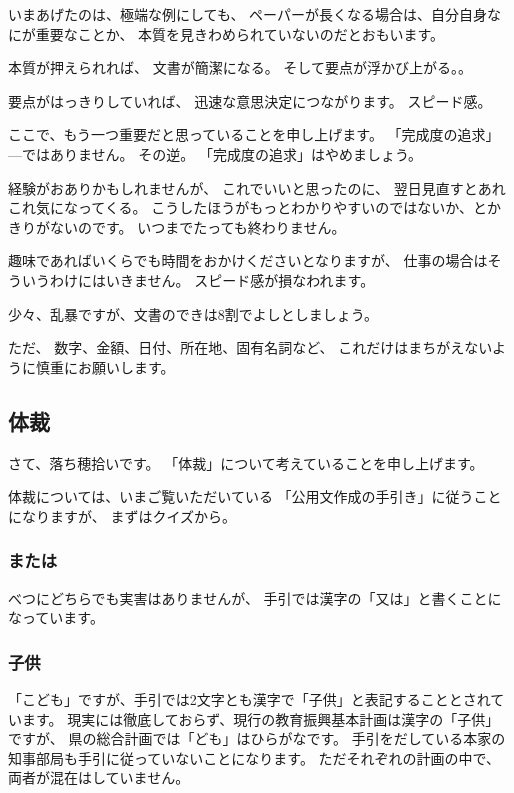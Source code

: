 \documentclass[uplatex,jis2004,dvipdfmx,12pt]{jsarticle}
\begin{document}
いまあげたのは、極端な例にしても、
ペーパーが長くなる場合は、自分自身なにが重要なことか、
本質を見きわめられていないのだとおもいます。

本質が押えられれば、
文書が簡潔になる。
そして要点が浮かび上がる。。


要点がはっきりしていれば、
迅速な意思決定につながります。
スピード感。

ここで、もう一つ重要だと思っていることを申し上げます。
「完成度の追求」---ではありません。
その逆。
「完成度の追求」はやめましょう。

経験がおありかもしれませんが、
これでいいと思ったのに、
翌日見直すとあれこれ気になってくる。
こうしたほうがもっとわかりやすいのではないか、とかきりがないのです。
いつまでたっても終わりません。

趣味であればいくらでも時間をおかけくださいとなりますが、
仕事の場合はそういうわけにはいきません。
スピード感が損なわれます。

少々、乱暴ですが、文書のできは8割でよしとしましょう。


ただ、
数字、金額、日付、所在地、固有名詞など、
これだけはまちがえないように慎重にお願いします。




\subsection{体裁}
さて、落ち穂拾いです。
「体裁」について考えていることを申し上げます。


体裁については、いまご覧いただいている
「公用文作成の手引き」に従うことになりますが、
まずはクイズから。

\subsubsection{または}
べつにどちらでも実害はありませんが、
手引では漢字の「又は」と書くことになっています。


\subsubsection{子供}
「こども」ですが、手引では2文字とも漢字で「子供」と表記することとされています。
現実には徹底しておらず、現行の教育振興基本計画は漢字の「子供」ですが、
県の総合計画では「ども」はひらがなです。
手引をだしている本家の知事部局も手引に従っていないことになります。
ただそれぞれの計画の中で、
両者が混在はしていません。
\end{document}
